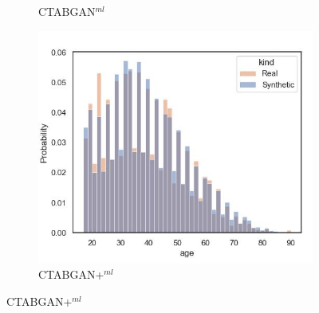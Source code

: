 \begin{figure}[H]
\begin{subfigure}{0.3\textwidth}
		\caption{CTABGAN$^{ml}$}
	\end{subfigure}
	\begin{subfigure}{0.3\textwidth}
		\centering
		\includegraphics[width=\textwidth]{images/dist_age/ctabgan+.jpg}
		\caption{CTABGAN+$^{ml}$}
	\end{subfigure}



\end{figure}
